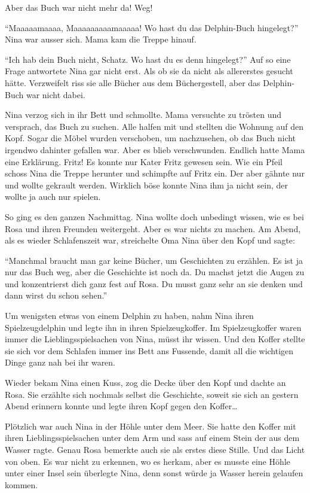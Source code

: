 \begin{mdframed}[style=mystyle]
Aber das Buch war nicht mehr da! Weg!

\enquote{Maaaaamaaaa, Maaaaaaaaamaaaaa! Wo hast du das Delphin-Buch hingelegt?} Nina war ausser sich. Mama kam die Treppe hinauf.

\enquote{Ich hab dein Buch nicht, Schatz. Wo hast du es denn hingelegt?} Auf so eine Frage antwortete Nina gar nicht erst. Als ob sie da nicht als allererstes gesucht hätte. Verzweifelt riss sie alle Bücher aus dem Büchergestell, aber das Delphin-Buch war nicht dabei.

Nina verzog sich in ihr Bett und schmollte. Mama versuchte zu trösten und versprach, das Buch zu suchen. Alle halfen mit und stellten die Wohnung auf den Kopf. Sogar die Möbel wurden verschoben, um nachzusehen, ob das Buch nicht irgendwo dahinter gefallen war. Aber es blieb verschwunden.  Endlich hatte Mama eine Erklärung. Fritz! Es konnte nur Kater Fritz gewesen sein. Wie ein Pfeil schoss Nina die Treppe herunter und schimpfte auf Fritz ein. Der aber gähnte nur und wollte gekrault werden. Wirklich böse konnte Nina ihm ja nicht sein, der wollte ja auch nur spielen.

So ging es den ganzen Nachmittag. Nina wollte doch unbedingt wissen, wie es bei Rosa und ihren Freunden weitergeht. Aber es war nichts zu machen. Am Abend, als es wieder Schlafenszeit war, streichelte Oma Nina über den Kopf und sagte:

\enquote{Manchmal braucht man gar keine Bücher, um Geschichten zu erzählen. Es ist ja nur das Buch weg, aber die Geschichte ist noch da. Du machst jetzt die Augen zu und konzentrierst dich ganz fest auf Rosa. Du musst ganz sehr an sie denken und dann wirst du schon sehen.}

Um wenigsten etwas von einem Delphin zu haben, nahm Nina ihren Spielzeugdelphin und legte ihn in ihren Spielzeugkoffer. Im Spielzeugkoffer waren immer die Lieblingsspielsachen von Nina, müsst ihr wissen. Und den Koffer stellte sie sich vor dem Schlafen immer ins Bett ans Fussende, damit all die wichtigen Dinge ganz nah bei ihr waren.

Wieder bekam Nina einen Kuss, zog die Decke über den Kopf und dachte an Rosa. Sie erzählte sich nochmals selbst die Geschichte, soweit sie sich an gestern Abend erinnern konnte und legte ihren Kopf gegen den Koffer\dots
\end{mdframed}\medskip

Plötzlich war auch Nina in der Höhle unter dem Meer. Sie hatte den Koffer mit ihren Lieblingsspielsachen unter dem Arm und sass auf einem Stein der aus dem Wasser ragte. Genau Rosa bemerkte auch sie als erstes diese Stille. Und das Licht von oben. Es war nicht zu erkennen, wo es herkam, aber es musste eine Höhle unter einer Insel sein überlegte Nina, denn sonst würde ja Wasser herein gelaufen kommen.

